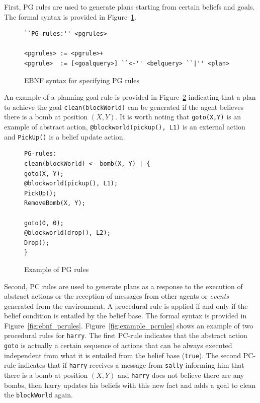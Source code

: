 \documentclass[a4paper]{article}
\begin{document}
First, PG rules are used to generate plans starting from certain beliefs and goals. The formal syntax is provided in Figure~\ref{fig:ebnf_pgrules}.

\begin{figure}[htp]
\begin{verbatim}
``PG-rules:'' <pgrules>

<pgrules> := <pgrule>+
<pgrule>  := [<goalquery>] ``<-'' <belquery> ``|'' <plan>
\end{verbatim}
\caption{EBNF syntax for specifying PG rules}
\label{fig:ebnf_pgrules}
\end{figure}

An example of a planning goal rule is provided in Figure~\ref{fig:example_pgrules} indicating that a plan to achieve the goal \texttt{clean(blockWorld)} can be generated if the agent believes there is a bomb at position $(X,Y)$. It is worth noting that \texttt{goto(X,Y)} is an example of abstract action, \texttt{@blockworld(pickup(), L1)} is an external action and \texttt{PickUp()} is a belief update action.

\begin{figure}[htp]
\begin{verbatim}
PG-rules:
clean(blockWorld) <- bomb(X, Y) | { 
goto(X, Y);
@blockworld(pickup(), L1);
PickUp();
RemoveBomb(X, Y);

goto(0, 0);
@blockworld(drop(), L2);
Drop();
}
\end{verbatim}
\caption{Example of PG rules}
\label{fig:example_pgrules}
\end{figure}

Second, PC rules are used to generate plans as a response to the execution of abstract actions or the reception of messages from other agents or \emph{events} generated from the environment. A procedural rule is applied if and only if the belief condition is entailed by the belief base. The formal syntax is provided in Figure~\ref{fig:ebnf_pcrules}.
Figure~\ref{fig:example_pcrules} shows an example of two procedural rules for \texttt{harry}. The first PC-rule indicates that the abstract action \texttt{goto} is actually a certain sequence of actions that can be always executed independent from what it is entailed from the belief base (\texttt{true}). The second PC-rule indicates that if \texttt{harry} receives a message from \texttt{sally} informing him that there is a bomb at position $(X,Y)$ and \texttt{harry} does not believe there are any bombs, then harry updates his beliefs with this new fact and adds a goal to clean the \texttt{blockWorld} again.
\end{document}

